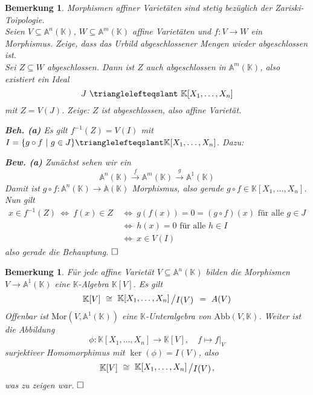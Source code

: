 \documentclass[11pt]{book}
\newtheorem{remark}[theorem]{Bemerkung}
\theoremstyle{nonumberbreak}
\newenvironment{pr}[1][]{\ifthenelse{\equal{#1}{}}{\proof}{\proof[#1]}\rm}{\endproof}
\newcommand{\slant}[2]{{\raisebox{.1em}{$#1$}\left/\raisebox{-.1em}{$#2$}\right.}}
\begin{document}
\begin{spacing}{1.3}
\begin{remark} %
Morphismen affiner Varietäten sind stetig bezüglich der Zariski-Toipologie.\\[-22pt]
\begin{pr} Seien $V \subseteq \mathbb{A}^n(\mathbb{K})$, $W\subseteq \mathbb{A}^m(\mathbb{K})$ affine Varietäten und $f:V\longrightarrow W$ ein Morphismus. Zeige, dass das Urbild abgeschlossener Mengen wieder abgeschlossen ist.\\
Sei $Z \subseteq W$ abgeschlossen. Dann ist $Z$ auch abgeschlossen in $\mathbb{A}^m(\mathbb{K})$, also existiert ein Ideal $$J\ \trianglelefteqslant \ \mathbb{K}[X_1, \ldots, X_n]$$ mit $Z=V(J)$. Zeige: $Z$ ist abgeschlossen, also affine Varietät.
\begin{compactenum}
\item[\textbf{Beh. (a)}] Es gilt $f^{-1}(Z)=V(I)$ mit $I= \{g \circ f \ \vert \ g \in J \} \trianglelefteqslant \mathbb{K}[X_1, \ldots, X_n]$. Dazu:
\item[\textbf{Bew. (a)}] Zunächst sehen wir ein
$$\mathbb{A}^n(\mathbb{K}) \overset{f}{\longrightarrow} \mathbb{A}^m(\mathbb{K}) \overset{g}{\longrightarrow} \mathbb{A}^1(\mathbb{K})$$
Damit ist $g\circ f: \mathbb{A}^n(\mathbb{K}) \longrightarrow \mathbb{A}(\mathbb{K})$ Morphismus, also gerade $g \circ f \in \mathbb{K}[X_1, \ldots, X_n]$. Nun gilt
\begin{alignat*}{5}
x \in f^{-1}(Z) \ \Longleftrightarrow \ f(x) \in Z \ &\Longleftrightarrow \ g(f(x))=0=(g\circ f)(x) \textrm{ für alle } g \in J\\
&\Longleftrightarrow \ h(x)=0 \textrm{ für alle } h \in I \\
&\Longleftrightarrow \ x \in V(I)
\end{alignat*}
also gerade die Behauptung. $\hfill \Box$
\end{compactenum}
\end{pr}
\end{remark}

\begin{remark} %
Für jede affine Varietät $V \subseteq \mathbb{A}^n(\mathbb{K})$ bilden die Morphismen $V \longrightarrow \mathbb{A}^1(\mathbb{K})$ eine $\mathbb{K}$-Algebra $\mathbb{K}[V]$. Es gilt
$$\mathbb{K}[V] \ \cong\ \slant{ \mathbb{K}[X_1, \ldots, X_n]}{I(V)} \ =\ A(V)$$
\begin{pr}
Offenbar ist $\textrm{Mor}(V, \mathbb{A}^1(\mathbb{K}))$ eine $\mathbb{K}$-Unteralgebra von $\textrm{Abb}(V, \mathbb{K})$. Weiter ist die Abbildung
$$\phi: \mathbb{K}[X_1, \ldots, X_n]  \longrightarrow \mathbb{K}[V], \quad f \mapsto f \vert_{V}$$
surjektiver Homomorphimus mit $\ker(\phi)=I(V)$, also
$$\mathbb{K}[V] \ \cong \ \slant{\mathbb{K}[X_1, \ldots, X_n]}{I(V)},$$
was zu zeigen war. $\hfill \Box$
\end{pr}
\end{remark}


\end{spacing}
\end{document}
